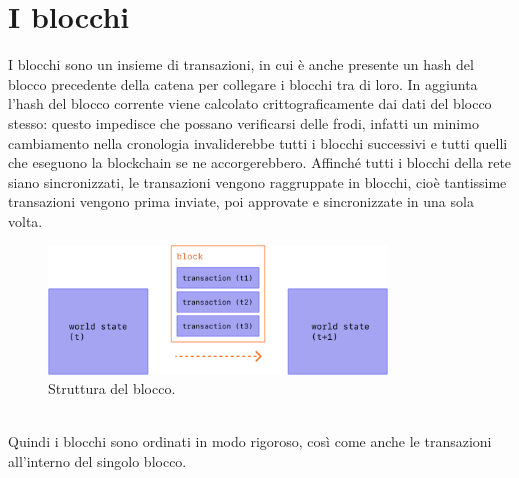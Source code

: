 \documentclass[a4paper,11pt]{report}
\begin{document}
\section{I blocchi}
I blocchi sono un insieme di transazioni, in cui è anche presente un hash del blocco precedente della catena per collegare i blocchi tra di loro. In aggiunta l'hash del blocco corrente viene calcolato crittograficamente dai dati del blocco stesso: questo impedisce che possano verificarsi delle frodi, infatti un minimo cambiamento nella cronologia invaliderebbe tutti i blocchi successivi e tutti quelli che eseguono la blockchain se ne accorgerebbero.
Affinché tutti i blocchi della rete siano sincronizzati, le transazioni vengono raggruppate in blocchi, cioè tantissime transazioni vengono prima inviate, poi approvate e sincronizzate in una sola volta.\\
\begin{figure}[htbp] 
\begin{center}
\includegraphics[width=9cm]{img/tx-block.png} 
\end{center}
\caption{Struttura del blocco. \cite{ether}}
\end{figure}
\\Quindi i blocchi sono ordinati in modo rigoroso, così come anche le transazioni all'interno del singolo blocco.

\newpage
\end{document}
